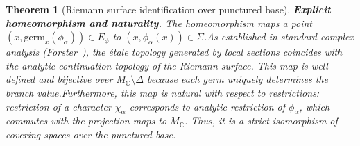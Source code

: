 \documentclass[11pt]{article}
\newtheorem{theorem}{Theorem}[section]
\begin{document}
\begin{theorem}[Riemann surface identification over punctured base]
\textbf{Explicit homeomorphism and naturality.}
The homeomorphism maps a point $(x, \text{germ}_x(\phi_\alpha)) \in E_\phi$ to $(x, \phi_\alpha(x)) \in \Sigma$.\linebreak As established in standard complex analysis (Forster~\cite[Ch.1]{Forster81}), the \'etale topology generated by local sections coincides with the analytic continuation topology of the Riemann surface.
This map is well-defined and bijective over $M_\mathbb{C} \setminus \Delta$ because each germ uniquely determines the branch value.\linebreak Furthermore, this map is \emph{natural} with respect to restrictions: restriction of a character $\chi_\alpha$ corresponds to analytic restriction of $\phi_\alpha$, which commutes with the projection maps to $M_\mathbb{C}$. Thus, it is a strict isomorphism of covering spaces over the punctured base.
\end{theorem}
\end{document}
